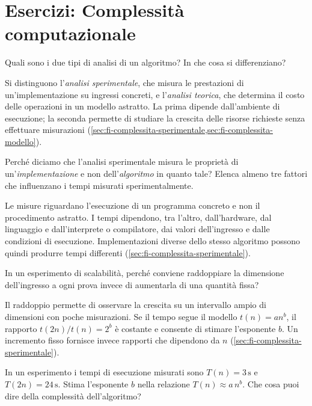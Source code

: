 \chapter{Esercizi: Complessità computazionale}
\label{chap:esercizi-complessita}

\begin{exercise}
\label{ex:fi-esercizi-complessita-tipi-analisi}
Quali sono i due tipi di analisi di un algoritmo? In che cosa
si differenziano?
\end{exercise}

Si distinguono l'\emph{analisi sperimentale}, che misura le prestazioni
di un'implementazione su ingressi concreti, e l'\emph{analisi teorica},
che determina il costo delle operazioni in un modello astratto.
La prima dipende dall'ambiente di esecuzione; la seconda permette
di studiare la crescita delle risorse richieste senza effettuare
misurazioni (\cref{sec:fi-complessita-sperimentale,sec:fi-complessita-modello}).

\begin{exercise}
\label{ex:fi-esercizi-complessita-sperimentale-implementazione}
Perché diciamo che l'analisi sperimentale misura le proprietà di
un'\emph{implementazione} e non dell'\emph{algoritmo} in quanto tale?
Elenca almeno tre fattori che influenzano i tempi misurati
sperimentalmente.
\end{exercise}

Le misure riguardano l'esecuzione di un programma concreto e non
il procedimento astratto. I tempi dipendono, tra l'altro,
dall'hardware, dal linguaggio e dall'interprete o compilatore,
dai valori dell'ingresso e dalle condizioni di esecuzione.
Implementazioni diverse dello stesso algoritmo possono quindi
produrre tempi differenti (\cref{sec:fi-complessita-sperimentale}).

\begin{exercise}
\label{ex:fi-esercizi-complessita-raddoppio}
In un esperimento di scalabilità, perché conviene raddoppiare
la dimensione dell'ingresso a ogni prova invece di aumentarla
di una quantità fissa?
\end{exercise}

Il raddoppio permette di osservare la crescita su un intervallo
ampio di dimensioni con poche misurazioni. Se il tempo segue
il modello \(t(n)=an^b\), il rapporto \(t(2n)/t(n)=2^b\) è costante
e consente di stimare l'esponente \(b\). Un incremento fisso
fornisce invece rapporti che dipendono da \(n\)
(\cref{sec:fi-complessita-sperimentale}).

\begin{exercise}
\label{ex:fi-esercizi-complessita-stima-esponente}
In un esperimento i tempi di esecuzione misurati sono
\(T(n)=3\,\mathrm{s}\) e \(T(2n)=24\,\mathrm{s}\). Stima l'esponente
\(b\) nella relazione \(T(n)\approx a\,n^b\). Che cosa puoi dire
della complessità dell'algoritmo?
\end{exercise}

